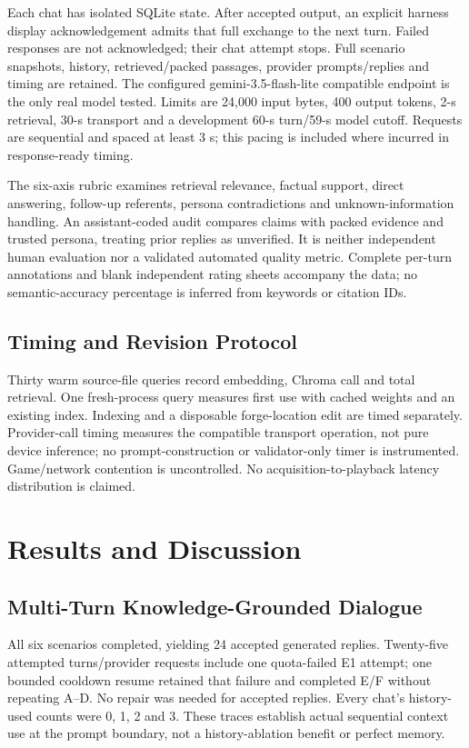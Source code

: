 \documentclass[conference]{IEEEtran}
\begin{document}
Each chat has isolated SQLite state. After accepted output, an explicit harness display acknowledgement admits that full exchange to the next turn. Failed responses are not acknowledged; their chat attempt stops. Full scenario snapshots, history, retrieved/packed passages, provider prompts/replies and timing are retained. The configured gemini-3.5-flash-lite compatible endpoint is the only real model tested. Limits are 24,000 input bytes, 400 output tokens, 2-s retrieval, 30-s transport and a development 60-s turn/59-s model cutoff. Requests are sequential and spaced at least 3 s; this pacing is included where incurred in response-ready timing.

The six-axis rubric examines retrieval relevance, factual support, direct answering, follow-up referents, persona contradictions and unknown-information handling. An assistant-coded audit compares claims with packed evidence and trusted persona, treating prior replies as unverified. It is neither independent human evaluation nor a validated automated quality metric. Complete per-turn annotations and blank independent rating sheets accompany the data; no semantic-accuracy percentage is inferred from keywords or citation IDs.

\subsection{Timing and Revision Protocol}
Thirty warm source-file queries record embedding, Chroma call and total retrieval. One fresh-process query measures first use with cached weights and an existing index. Indexing and a disposable forge-location edit are timed separately. Provider-call timing measures the compatible transport operation, not pure device inference; no prompt-construction or validator-only timer is instrumented. Game/network contention is uncontrolled. No acquisition-to-playback latency distribution is claimed.

\section{Results and Discussion}
\subsection{Multi-Turn Knowledge-Grounded Dialogue}
All six scenarios completed, yielding 24 accepted generated replies. Twenty-five attempted turns/provider requests include one quota-failed E1 attempt; one bounded cooldown resume retained that failure and completed E/F without repeating A--D. No repair was needed for accepted replies. Every chat's history-used counts were 0, 1, 2 and 3. These traces establish actual sequential context use at the prompt boundary, not a history-ablation benefit or perfect memory.
\end{document}
